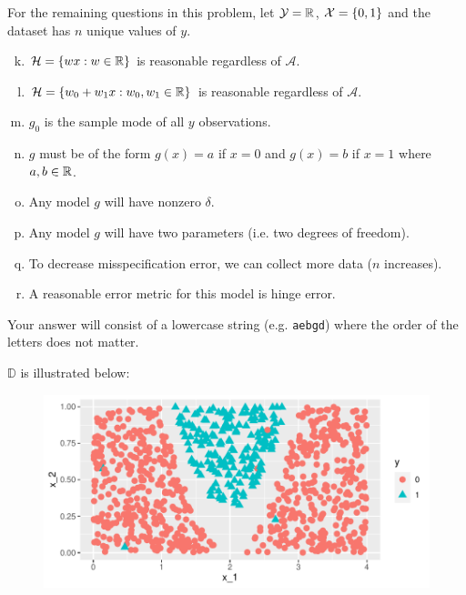 \documentclass[12pt,landscape]{article}
\newcommand{\instr}{\small Your answer will consist of a lowercase string (e.g. \texttt{aebgd}) where the order of the letters does not matter. \normalsize}
\begin{document}
For the remaining questions in this problem, let $\mathcal{Y} = \mathbb{R}$, $\mathcal{X} = \left\{0,1\right\}$ and the dataset has $n$ unique values of $y$.

\begin{enumerate}[(a)]
\setcounter{enumi}{10}
\item $\mathcal{H} = \left\{w x : w \in \mathbb{R}\right\}$ is reasonable regardless of $\mathcal{A}$.
\item $\mathcal{H} = \left\{w_0 + w_1 x : w_0, w_1 \in \mathbb{R}\right\}$ is reasonable regardless of $\mathcal{A}$.
\item $g_0$ is the sample mode of all $y$ observations.
\item $g$ must be of the form $g(x) = a$ if $x = 0$ and $g(x) = b$ if $x=1$ where $a,b \in \mathbb{R}$.
\item Any model $g$ will have nonzero $\delta$.
\item Any model $g$ will have two parameters (i.e. two degrees of freedom).
\item To decrease misspecification error, we can collect more data ($n$ increases).
\item A reasonable error metric for this model is hinge error.
\end{enumerate}
\eenum\instr\pagebreak


\problem{} $\mathbb{D}$ is illustrated below:

\begin{figure}[htp]
\centering
\includegraphics[width = 6in]{binary.pdf}
\end{figure}

\vspace{-0.2cm}\benum{} 
\end{document}
